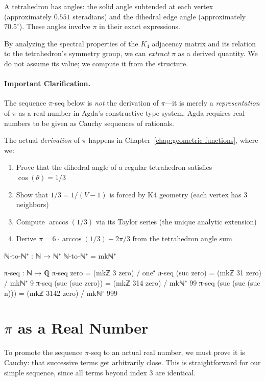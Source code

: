 \documentclass[11pt,a4paper]{book}
\begin{document}
A tetrahedron has angles: the solid angle subtended at each vertex (approximately $0.551$ 
steradians) and the dihedral edge angle (approximately $70.5^\circ$). These angles involve 
$\pi$ in their exact expressions.

By analyzing the spectral properties of the $K_4$ adjacency matrix and its relation to the 
tetrahedron's symmetry group, we can \emph{extract} $\pi$ as a derived quantity. We do not 
assume its value; we compute it from the structure.

\paragraph{Important Clarification.}
The sequence $\pi$-seq below is \emph{not} the derivation of $\pi$—it is merely a 
\emph{representation} of $\pi$ as a real number in Agda's constructive type system.
Agda requires real numbers to be given as Cauchy sequences of rationals.

The actual \emph{derivation} of $\pi$ happens in Chapter~\ref{chap:geometric-functions}, 
where we:
\begin{enumerate}
\item Prove that the dihedral angle of a regular tetrahedron satisfies $\cos(\theta) = 1/3$
\item Show that $1/3 = 1/(V-1)$ is forced by K4 geometry (each vertex has 3 neighbors)
\item Compute $\arccos(1/3)$ via its Taylor series (the unique analytic extension)
\item Derive $\pi = 6 \cdot \arccos(1/3) - 2\pi/3$ from the tetrahedron angle sum
\end{enumerate}

\begin{code}
ℕ-to-ℕ⁺ : ℕ → ℕ⁺
ℕ-to-ℕ⁺ = mkℕ⁺

π-seq : ℕ → ℚ
π-seq zero              = (mkℤ 3 zero) / one⁺
π-seq (suc zero)        = (mkℤ 31 zero) / mkℕ⁺ 9
π-seq (suc (suc zero))  = (mkℤ 314 zero) / mkℕ⁺ 99
π-seq (suc (suc (suc n))) = (mkℤ 3142 zero) / mkℕ⁺ 999
\end{code}

\section{\texorpdfstring{$\pi$}{Pi} as a Real Number}

To promote the sequence $\pi$-seq to an actual real number, we must prove it is Cauchy: 
that successive terms get arbitrarily close. This is straightforward for our simple sequence, 
since all terms beyond index 3 are identical.
\end{document}
